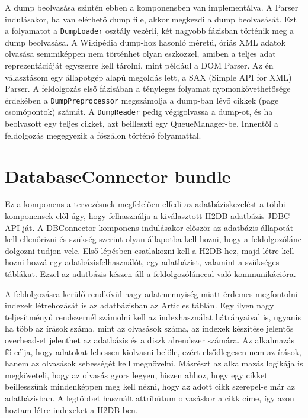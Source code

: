 A dump beolvasása szintén ebben a komponensben van implementálva. A Parser indulásakor, ha van elérhető dump file, akkor megkezdi a dump beolvasását. Ezt a folyamatot a \texttt{DumpLoader} osztály vezérli, két nagyobb fázisban történik meg a dump beolvasása. A Wikipédia dump-hoz hasonló méretű, óriás XML adatok olvasása semmiképpen nem történhet olyan eszközzel, amiben a teljes adat reprezentációját egyszerre kell tárolni, mint például a DOM Parser. Az én választásom egy állapotgép alapú megoldás lett, a SAX (Simple API for XML) Parser. A feldolgozás első fázisában a tényleges folyamat nyomonkövethetősége érdekében a \texttt{DumpPreprocessor} megszámolja a dump-ban lévő cikkek (page csomópontok) számát. A \texttt{DumpReader} pedig végigolvassa a dump-ot, és ha beolvasott egy teljes cikket, azt beilleszti egy QueueManager-be. Innentől a feldolgozás megegyezik a főszálon történő folyamattal.


\section{DatabaseConnector bundle}
\label{sec:dbconnectorbundle}

Ez a komponens a tervezésnek megfelelően elfedi az adatbáziskezelést a többi komponensek elől úgy, hogy felhasználja a kiválasztott H2DB adatbázis JDBC API-ját. A DBConnector komponens indulásakor először az adatbázis állapotát kell ellenőrizni és szükség szerint olyan állapotba kell hozni, hogy a feldolgozólánc dolgozni tudjon vele. Első lépésben csatlakozni kell a H2DB-hez, majd létre kell hozni hozzá egy adatbázisfelhasználót, egy adatbázist, valamint a szükséges táblákat. Ezzel az adatbázis készen áll a feldolgozólánccal való kommunikációra.

A feldolgozásra kerülő rendkívül nagy adatmennyiség miatt érdemes megfontolni indexek létrehozását is az adatbázisban az Articles táblán. Egy ilyen nagy teljesítményű rendszernél számolni kell az indexhasználat hátrányaival is, ugyanis ha több az írások száma, mint az olvasások száma, az indexek készítése jelentős overhead-et jelenthet az adatbázis és a diszk alrendszer számára. Az alkalmazás fő célja, hogy adatokat lehessen kiolvasni belőle, ezért elsődlegesen nem az írások, hanem az olvasások sebességét kell megnövelni. Másrészt az alkalmazás logikája is megköveteli, hogy az olvasás gyors legyen, hiszen ahhoz, hogy egy cikket beillesszünk mindenképpen meg kell nézni, hogy az adott cikk szerepel-e már az adatbázisban. A legtöbbet használt attríbútum olvasáskor a cikk címe, így azon hoztam létre indexeket a H2DB-ben.

